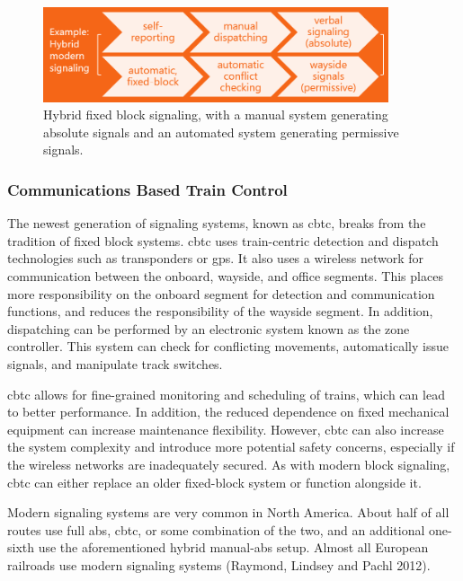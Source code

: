 \documentclass[11pt, titlepage]{article}
\begin{document}
\begin{figure}[ht]
    \begin{center}
        \includegraphics[width=4in]{HybridSignaling.png}
        \captionsetup{justification=centering}
        \caption{Hybrid fixed block signaling, with a manual system generating
        absolute signals and an automated system generating permissive signals.}
    \end{center}
\end{figure}

\subsubsection{Communications Based Train Control}

The newest generation of signaling systems, known as \gls{cbtc}, breaks from the
tradition of fixed block systems. \gls{cbtc} uses train-centric detection and
dispatch technologies such as transponders or \gls{gps}. It also uses a wireless
network for communication between the onboard, wayside, and office segments. This
places more responsibility on the onboard segment for detection and communication
functions, and reduces the responsibility of the wayside segment. In addition,
dispatching can be performed by an electronic system known as the zone controller.
This system can check for conflicting movements, automatically issue signals, and
manipulate track switches.

\gls{cbtc} allows for fine-grained monitoring and scheduling of trains, which can
lead to better performance. In addition, the reduced dependence on fixed mechanical
equipment can increase maintenance flexibility. However, \gls{cbtc} can also
increase the system complexity and introduce more potential safety concerns,
especially if the wireless networks are inadequately secured. As with modern block
signaling, \gls{cbtc} can either replace an older fixed-block system or function
alongside it.

Modern signaling systems are very common in North America. About half of all routes
use full \gls{abs}, \gls{cbtc}, or some combination of the two, and an additional
one-sixth use the aforementioned hybrid manual-\gls{abs} setup. Almost all European
railroads use modern signaling systems (Raymond, Lindsey and Pachl 2012).
\end{document}
